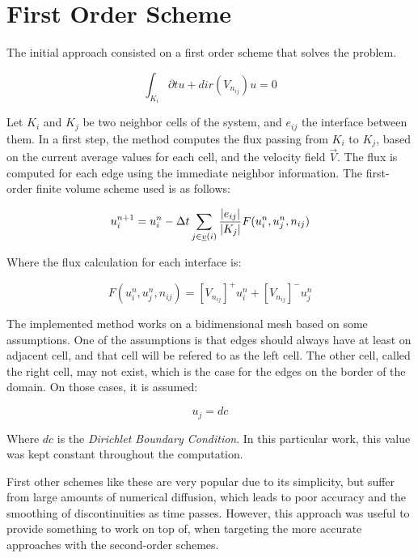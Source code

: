 \section{First Order Scheme}
\label{sec:200}

The initial approach consisted on a first order scheme that solves the problem.

$$ \int_{K_i} \partial{t} u + dir(V_{n_{ij}})u = 0 $$

Let $K_i$ and $K_j$ be two neighbor cells of the system, and $e_{ij}$ the interface between them. In a first step, the method computes the flux passing from $K_i$ to $K_j$, based on the current average values for each cell, and the velocity field $\vec{V}$. The flux is computed for each edge using the immediate neighbor information. The first-order finite volume scheme used is as follows:

$$ u_i^{n+1} = u_i^n - \Delta{t} \sum_{j \in \underline{v}(i)} {|e_{ij}| \over |K_j|} F(u_i^n, u_j^n, n_{ij}) $$

Where the flux calculation for each interface is:

$$ F(u_i^n, u_j^n, n_{ij}) = [V_{n_{ij}}]^{+}u_i^n + [V_{n_{ij}}]^{-}u_j^n $$

The implemented method works on a bidimensional mesh based on some assumptions. One of the assumptions is that edges should always have at least on adjacent cell, and that cell will be refered to as the left cell. The other cell, called the right cell, may not exist, which is the case for the edges on the border of the domain. On those cases, it is assumed:

$$ u_j = dc $$

Where $dc$ is the \textit{Dirichlet Boundary Condition}. In this particular work, this value was kept constant throughout the computation.

First other schemes like these are very popular due to its simplicity, but suffer from large amounts of numerical diffusion, which leads to poor accuracy and the smoothing of discontinuities as time passes. However, this approach was useful to provide something to work on top of, when targeting the more accurate approaches with the second-order schemes.